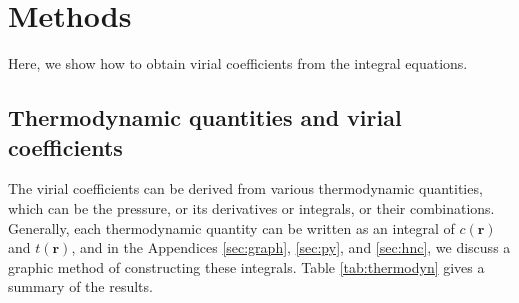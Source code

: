 \documentclass[aip,jcp,reprint,superscriptaddress]{revtex4-1}
\newcommand{\vct}[1]{\mathbf{#1}}
\providecommand{\vr}{} %
\renewcommand{\vr}{\vct{r}}
\begin{document}
\section{\label{sec:methods}Methods}

Here, we show how to obtain virial coefficients from the integral equations.

\subsection{Thermodynamic quantities and virial coefficients}

The virial coefficients can be derived from
  various thermodynamic quantities,
  which can be the pressure, or its derivatives or integrals,
  or their combinations.
%
Generally, each thermodynamic quantity
  can be written as an integral of $c(\vr)$ and $t(\vr)$,
  and in the Appendices \ref{sec:graph}, \ref{sec:py}, and \ref{sec:hnc},
  we discuss a graphic method\cite{
  morita1958, *morita1959, *morita1960, baxterpressure}
  of constructing these integrals.
%
Table \ref{tab:thermodyn}
  gives a summary of the results.
\end{document}
